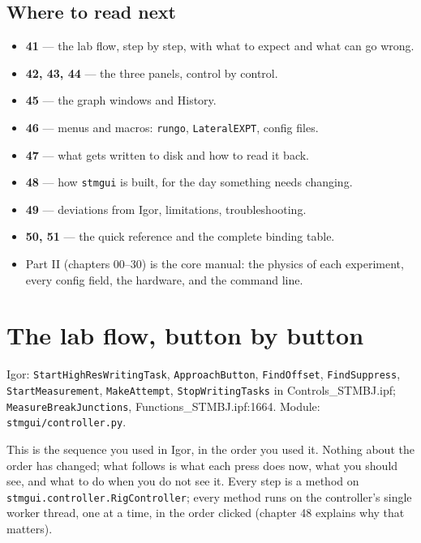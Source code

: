 \section{Where to read next}

\begin{itemize}[leftmargin=*]
\item \textbf{41} --- the lab flow, step by step, with what to expect and what can go wrong.
\item \textbf{42, 43, 44} --- the three panels, control by control.
\item \textbf{45} --- the graph windows and History.
\item \textbf{46} --- menus and macros: \texttt{rungo}, \texttt{Lateral\discretionary{}{}{}EXPT}, config files.
\item \textbf{47} --- what gets written to disk and how to read it back.
\item \textbf{48} --- how \texttt{stmgui} is built, for the day something needs changing.
\item \textbf{49} --- deviations from Igor, limitations, troubleshooting.
\item \textbf{50, 51} --- the quick reference and the complete binding table.
\item Part II (chapters 00--30) is the core manual: the physics of each experiment, every config field, the hardware, and the command line.
\end{itemize}

\setcounter{chapter}{40}
\chapter{The lab flow, button by button}

\begin{keybox}\small Igor: \texttt{Start\discretionary{}{}{}High\discretionary{}{}{}Res\discretionary{}{}{}Writing\discretionary{}{}{}Task}, \texttt{Approach\discretionary{}{}{}Button}, \texttt{Find\discretionary{}{}{}Offset}, \texttt{Find\discretionary{}{}{}Suppress}, \texttt{Start\discretionary{}{}{}Measurement}, \texttt{Make\discretionary{}{}{}Attempt}, \texttt{Stop\discretionary{}{}{}Writing\discretionary{}{}{}Tasks} in Controls\_STMBJ.ipf; \texttt{Measure\discretionary{}{}{}Break\discretionary{}{}{}Junctions}, Functions\_STMBJ.ipf:1664. Module: \texttt{stmgui/\discretionary{}{}{}controller.\discretionary{}{}{}py}.\end{keybox}

This is the sequence you used in Igor, in the order you used it. Nothing about the order has changed; what follows is what each press does now, what you should see, and what to do when you do not see it. Every step is a method on \texttt{stmgui.\discretionary{}{}{}controller.\discretionary{}{}{}Rig\discretionary{}{}{}Controller}; every method runs on the controller's single worker thread, one at a time, in the order clicked (chapter 48 explains why that matters).

